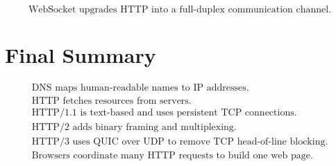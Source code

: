 \documentclass[12pt]{article}
\begin{document}
\[
\boxed{\text{WebSocket upgrades HTTP into a full-duplex communication channel.}}
\]

\section*{Final Summary}

\[
\boxed{
\begin{array}{l}
\text{DNS maps human-readable names to IP addresses.} \\
\text{HTTP fetches resources from servers.} \\
\text{HTTP/1.1 is text-based and uses persistent TCP connections.} \\
\text{HTTP/2 adds binary framing and multiplexing.} \\
\text{HTTP/3 uses QUIC over UDP to remove TCP head-of-line blocking.} \\
\text{Browsers coordinate many HTTP requests to build one web page.}
\end{array}
}
\]
\end{document}
